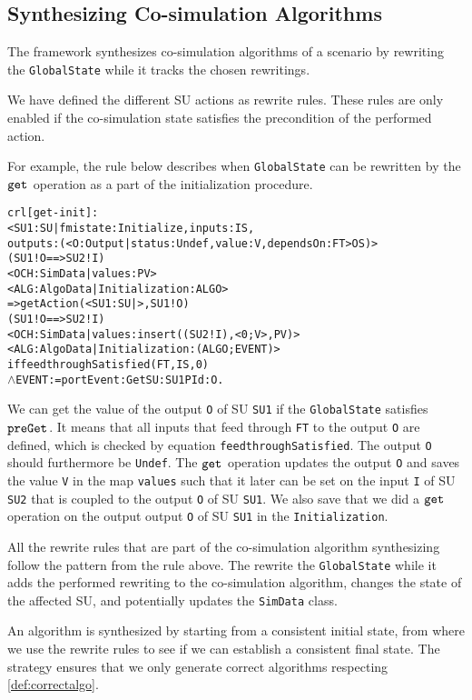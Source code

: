 \subsection{Synthesizing Co-simulation Algorithms}
The framework synthesizes co-simulation algorithms of a scenario by rewriting the \texttt{GlobalState} while it tracks the chosen rewritings.

We have defined the different SU actions as rewrite rules.
These rules are only enabled if the co-simulation state satisfies the precondition of the performed action.

For example, the rule below describes when \texttt{GlobalState} can be rewritten by the $\mathtt{get}_{}$ operation as a part of the initialization procedure.

\begin{alltt}
  \small
crl [get-init] :
< SU1 : SU | fmistate : Initialize, inputs : IS, 
  outputs : (< O : Output | status : Undef, value : V, dependsOn : FT > OS) > 
(SU1 ! O ==> SU2 ! I)
< OCH : SimData | values : PV > 
< ALG : AlgoData | Initialization : ALGO >
=> getAction(< SU1 : SU | >, SU1 ! O)
  (SU1 ! O ==> SU2 ! I)
  < OCH : SimData | values : insert((SU2 ! I), < 0 ; V >, PV) >  
  < ALG : AlgoData | Initialization : (ALGO ; EVENT) >
if feedthroughSatisfied(FT, IS, 0)
\(\land\) EVENT := portEvent: Get SU: SU1 PId: O . 
\end{alltt}

We can get the value of the output \texttt{O} of SU \texttt{SU1} if the \texttt{GlobalState} satisfies $\mathtt{preGet}_{}$.
It means that all inputs that feed through \texttt{FT} to the output \texttt{O} are defined, which is checked by equation \texttt{feedthroughSatisfied}.
The output \texttt{O} should furthermore be \texttt{Undef}.
The $\mathtt{get}_{}$ operation updates the output \texttt{O} and saves the value \texttt{V} in the map \texttt{values} such that it later can be set on the input \texttt{I} of SU \texttt{SU2} that is coupled to the output \texttt{O} of SU \texttt{SU1}.
We also save that we did a $\mathtt{get}_{}$ operation on the output  output \texttt{O} of SU \texttt{SU1} in the \texttt{Initialization}.

All the rewrite rules that are part of the co-simulation algorithm synthesizing follow the pattern from the rule above.
The rewrite the \texttt{GlobalState} while it adds the performed rewriting to the co-simulation algorithm, changes the state of the affected SU, and potentially updates the \texttt{SimData} class.

An algorithm is synthesized by starting from a consistent initial state, from where we use the rewrite rules to see if we can establish a consistent final state.
The strategy ensures that we only generate correct algorithms respecting \cref{def:correctalgo}. 


